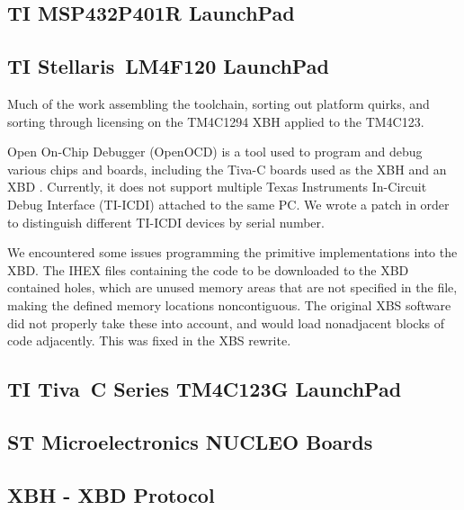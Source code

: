 \documentclass[twoside,11pt]{cergdoc}
\begin{document}
  \section{TI MSP432P401R LaunchPad\texttrademark}
  \section{TI Stellaris\textregistered~LM4F120 LaunchPad}
Much of the work assembling the toolchain, sorting out platform quirks, and
sorting through licensing on the TM4C1294 XBH applied to the TM4C123.

Open On-Chip Debugger (OpenOCD) is a tool used to program and debug various
chips and boards, including the Tiva-C boards used as the XBH and an XBD
\cite{openocd}. Currently, it does not support multiple Texas Instruments
In-Circuit Debug Interface (TI-ICDI) attached to the
same PC. We wrote a patch \cite{openocd_patch} in order to distinguish different
TI-ICDI devices by serial number. 

We encountered some issues programming the primitive implementations into the
XBD. The IHEX files containing the code to be downloaded to the XBD contained holes, which
are unused memory areas that are not specified in the file, making the defined
memory locations noncontiguous. The original XBS software did not properly take
these into account, and would load nonadjacent blocks of code adjacently. This
was fixed in the XBS rewrite. 

  \section{TI Tiva\texttrademark~C Series TM4C123G LaunchPad}
  \section{ST Microelectronics NUCLEO Boards}

\begin{appendix}
\chapter{XBH - XBD Protocol}
\end{appendix}
\end{document}
